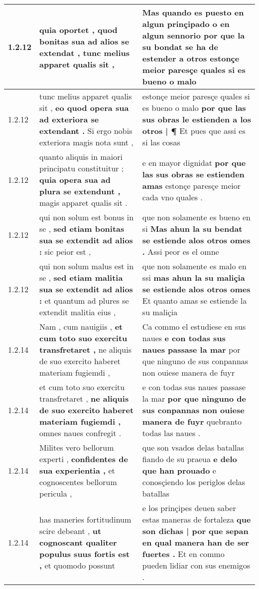 \begin{tabular}{|p{1cm}|p{6.5cm}|p{6.5cm}|}
1.2.12 & quia oportet , \textbf{ quod bonitas sua ad alios se extendat , } tunc melius apparet qualis sit , & Mas quando es puesto en algun prinçipado o en algun sennorio \textbf{ por que la su bondat se ha de estender a otros } estonçe meior paresçe quales si es bueno o malo \\\hline
1.2.12 & tunc melius apparet qualis sit , \textbf{ eo quod opera sua ad exteriora se extendant . } Si ergo nobis exteriora magis nota sunt , & estonçe meior paresçe quales si es bueno o malo \textbf{ por que las sus obras le estienden a los otros | ¶ } Et pues que assi es si las cosas \\\hline
1.2.12 & quanto aliquis in maiori principatu constituitur ; \textbf{ quia opera sua ad plura se extendunt , } magis apparet qualis sit . & e en mayor dignidat \textbf{ por que las sus obras se estienden amas } estonçe paresçe meior cada vno quales . \\\hline
1.2.12 & qui non solum est bonus in se , \textbf{ sed etiam bonitas sua se extendit ad alios : } sic peior est , & que non solamente es bueno en si \textbf{ Mas ahun la su bendat se estiende alos otros omes . } Assi peor es el omne \\\hline
1.2.12 & qui non solum malus est in se , \textbf{ sed etiam malitia sua se extendit ad alios : } et quantum ad plures se extendit malitia eius , & que non solamente es malo en ssi \textbf{ mas ahun la su maliçia se estiende alos otros omes } Et quanto amas se estiende la su maliçia \\\hline
1.2.14 & Nam , cum nauigiis , \textbf{ et cum toto suo exercitu transfretaret , } ne aliquis de suo exercito haberet materiam fugiemdi , & Ca commo el estudiese en sus naues \textbf{ e con todas sus naues passase la mar } por que ninguno de sus conpannas non ouiese manera de fuyr \\\hline
1.2.14 & et cum toto suo exercitu transfretaret , \textbf{ ne aliquis de suo exercito haberet materiam fugiemdi , } omnes naues confregit . & e con todas sus naues passase la mar \textbf{ por que ninguno de sus conpannas non ouiese manera de fuyr } quebranto todas las naues . \\\hline
1.2.14 & Milites vero bellorum experti , \textbf{ confidentes de sua experientia , } et cognoscentes bellorum pericula , & que son vsados delas batallas fiando de su praeua \textbf{ e delo que han prouado } e conosçiendo los periglos delas batallas \\\hline
1.2.14 & has maneries fortitudinum scire debeant , \textbf{ ut cognoscant qualiter populus suus fortis est , } et quomodo possunt & e los prinçipes deuen saber estas maneras de fortaleza \textbf{ que son dichas | por que sepan en qual manera han de ser fuertes . } Et en commo pueden lidiar con sus enemigos . \\\hline

\end{tabular}
